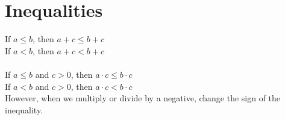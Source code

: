 \chapter{Inequalities}
\label{chap:Inequalities}
If $a \leq b$, then $a+c \leq b+c$ \\
If $a < b$, then $a+c < b+c$ \\
\\
If $a \leq b$ and $c > 0$, then $a \cdot c \leq b \cdot c$ \\
If $a < b$ and $c > 0$, then $a \cdot c < b \cdot c$ \\

However, when we multiply or divide by a negative, change the sign of the
inequality.
